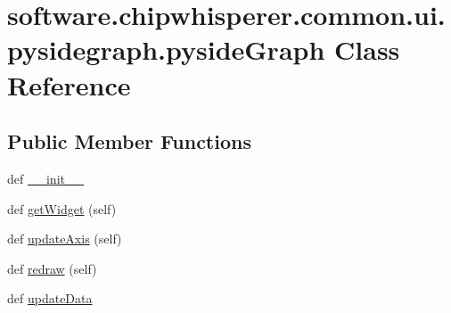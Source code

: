 \hypertarget{classsoftware_1_1chipwhisperer_1_1common_1_1ui_1_1pysidegraph_1_1pysideGraph}{}\section{software.\+chipwhisperer.\+common.\+ui.\+pysidegraph.\+pyside\+Graph Class Reference}
\label{classsoftware_1_1chipwhisperer_1_1common_1_1ui_1_1pysidegraph_1_1pysideGraph}
\subsection*{Public Member Functions}
\begin{DoxyCompactItemize}
\item 
def \hyperlink{classsoftware_1_1chipwhisperer_1_1common_1_1ui_1_1pysidegraph_1_1pysideGraph_a49bafadc7983523cb1b5554a5c02a3f7}{\+\_\+\+\_\+init\+\_\+\+\_\+}
\item 
def \hyperlink{classsoftware_1_1chipwhisperer_1_1common_1_1ui_1_1pysidegraph_1_1pysideGraph_a8f77708511153cf3cc66ba6b2de930b9}{get\+Widget} (self)
\item 
def \hyperlink{classsoftware_1_1chipwhisperer_1_1common_1_1ui_1_1pysidegraph_1_1pysideGraph_a426a8dae477fe542788a9d3e97008e8f}{update\+Axis} (self)
\item 
def \hyperlink{classsoftware_1_1chipwhisperer_1_1common_1_1ui_1_1pysidegraph_1_1pysideGraph_a5c75c08f86b50126c2861acfc379e188}{redraw} (self)
\item 
def \hyperlink{classsoftware_1_1chipwhisperer_1_1common_1_1ui_1_1pysidegraph_1_1pysideGraph_ab63045014992c8890a2bdd6ade31d34e}{update\+Data}
\end{DoxyCompactItemize}
